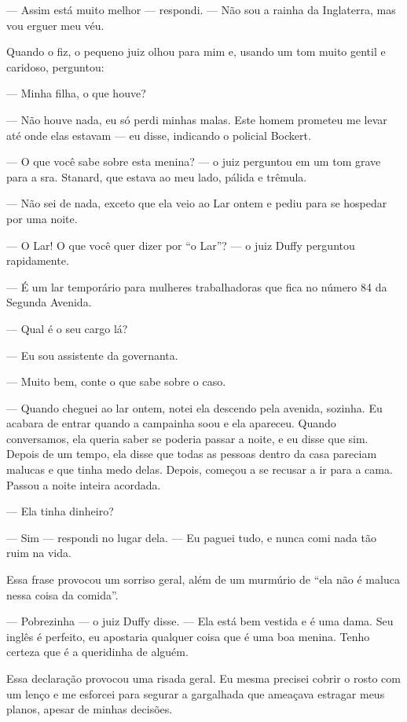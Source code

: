 --- Assim está muito melhor --- respondi. --- Não sou a rainha da
Inglaterra, mas vou erguer meu véu.

Quando o fiz, o pequeno juiz olhou para mim e, usando um tom muito
gentil e caridoso, perguntou:

--- Minha filha, o que houve?

--- Não houve nada, eu só perdi minhas malas. Este homem prometeu me
levar até onde elas estavam --- eu disse, indicando o policial Bockert.

--- O que você sabe sobre esta menina? --- o juiz perguntou em um tom
grave para a sra. Stanard, que estava ao meu lado, pálida e trêmula.

--- Não sei de nada, exceto que ela veio ao Lar ontem e pediu para se
hospedar por uma noite.

--- O Lar! O que você quer dizer por ``o Lar''? --- o juiz Duffy
perguntou rapidamente.

--- É um lar temporário para mulheres trabalhadoras que fica no número
84 da Segunda Avenida.

--- Qual é o seu cargo lá?

--- Eu sou assistente da governanta.

--- Muito bem, conte o que sabe sobre o caso.

--- Quando cheguei ao lar ontem, notei ela descendo pela avenida,
sozinha. Eu acabara de entrar quando a campainha soou e ela apareceu.
Quando conversamos, ela queria saber se poderia passar a noite, e eu
disse que sim. Depois de um tempo, ela disse que todas as pessoas dentro
da casa pareciam malucas e que tinha medo delas. Depois, começou a se
recusar a ir para a cama. Passou a noite inteira acordada.

--- Ela tinha dinheiro?

--- Sim --- respondi no lugar dela. --- Eu paguei tudo, e nunca comi
nada tão ruim na vida.

Essa frase provocou um sorriso geral, além de um murmúrio de ``ela não é
maluca nessa coisa da comida''.

--- Pobrezinha --- o juiz Duffy disse. --- Ela está bem vestida e é uma
dama. Seu inglês é perfeito, eu apostaria qualquer coisa que é uma boa
menina. Tenho certeza que é a queridinha de alguém.

Essa declaração provocou uma risada geral. Eu mesma precisei cobrir o
rosto com um lenço e me esforcei para segurar a gargalhada que ameaçava
estragar meus planos, apesar de minhas decisões.

